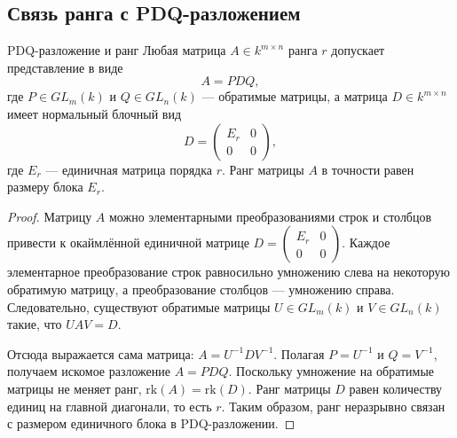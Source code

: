 \subsection{Связь ранга с PDQ-разложением}

\begin{Theorem}{PDQ-разложение и ранг}{}
	Любая матрица $A \in k^{m \times n}$ ранга $r$ допускает представление в виде
	\[
	A = P D Q,
	\]
	где $P \in GL_m(k)$ и $Q \in GL_n(k)$ — обратимые матрицы, а матрица $D \in k^{m \times n}$ имеет нормальный блочный вид
	\[
	D = \begin{pmatrix} E_r & 0 \\ 0 & 0 \end{pmatrix},
	\]
	где $E_r$ — единичная матрица порядка $r$. Ранг матрицы $A$ в точности равен размеру блока $E_r$.
\end{Theorem}

\begin{proof}
	Матрицу $A$ можно элементарными преобразованиями строк и столбцов привести к окаймлённой единичной матрице $D = \begin{pmatrix} E_r & 0 \\ 0 & 0 \end{pmatrix}$. 
	Каждое элементарное преобразование строк равносильно умножению слева на некоторую обратимую матрицу, а преобразование столбцов — умножению справа. Следовательно, существуют обратимые матрицы $U \in GL_m(k)$ и $V \in GL_n(k)$ такие, что $U A V = D$. 
	
	Отсюда выражается сама матрица: $A = U^{-1} D V^{-1}$. Полагая $P = U^{-1}$ и $Q = V^{-1}$, получаем искомое разложение $A = P D Q$.
	Поскольку умножение на обратимые матрицы не меняет ранг, $\mathrm{rk}(A) = \mathrm{rk}(D)$. Ранг матрицы $D$ равен количеству единиц на главной диагонали, то есть $r$. Таким образом, ранг неразрывно связан с размером единичного блока в PDQ-разложении.
\end{proof}
